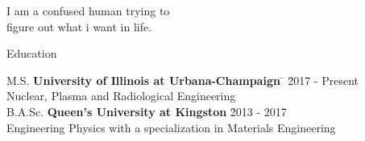 \documentclass{resume2} %
\begin{document}
\centering
I am a confused human trying to \\
figure out what i want in life. 

\raggedright

\begin{rSection}{Education}
	
\begin{tabbing}
M.S. \hspace*{2 em}\= \textbf{University of Illinois at Urbana-Champaign} \hspace*{5em} \= \hspace*{6em} \= 2017 - Present \\
\> Nuclear, Plasma and Radiological Engineering \\
%
B.A.Sc. \hspace*{2 em}\> \textbf{Queen's University at Kingston} \> \hspace*{7.2em} \= 2013 - 2017 \\
\> Engineering Physics with a specialization in Materials Engineering
\end{tabbing}

\end{rSection}

\end{document}
